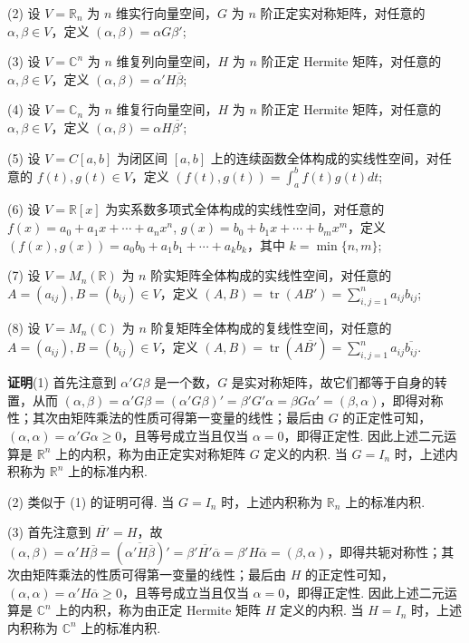 \documentclass[UTF8,12pt,a4paper,fontset=fandol]{ctexart}
\begin{document}
(2) 设 $V=\mathbb{R}_n$ 为 $n$ 维实行向量空间，$G$ 为 $n$ 阶正定实对称矩阵，对任意的 $\alpha,\beta\in V$，定义 $(\alpha,\beta)=\alpha G\beta'$;

(3) 设 $V=\mathbb{C}^n$ 为 $n$ 维复列向量空间，$H$ 为 $n$ 阶正定 Hermite 矩阵，对任意的 $\alpha,\beta\in V$，定义 $(\alpha,\beta)=\alpha'H\overline{\beta}$;

(4) 设 $V=\mathbb{C}_n$ 为 $n$ 维复行向量空间，$H$ 为 $n$ 阶正定 Hermite 矩阵，对任意的 $\alpha,\beta\in V$，定义 $(\alpha,\beta)=\alpha H\overline{\beta'}$;

(5) 设 $V=C[a,b]$ 为闭区间 $[a,b]$ 上的连续函数全体构成的实线性空间，对任意的 $f(t),g(t)\in V$，定义 $(f(t),g(t))=\int_a^b f(t)g(t)dt$;

(6) 设 $V=\mathbb{R}[x]$ 为实系数多项式全体构成的实线性空间，对任意的 $f(x)=a_0+a_1x+\cdots+a_nx^n$, $g(x)=b_0+b_1x+\cdots+b_mx^m$，定义 $(f(x),g(x))=a_0b_0+a_1b_1+\cdots+a_kb_k$，其中 $k=\min\{n,m\}$;

(7) 设 $V=M_n(\mathbb{R})$ 为 $n$ 阶实矩阵全体构成的实线性空间，对任意的 $A=(a_{ij}),B=(b_{ij})\in V$，定义 $(A,B)=\operatorname{tr}(AB')=\sum_{i,j=1}^n a_{ij}b_{ij}$;

(8) 设 $V=M_n(\mathbb{C})$ 为 $n$ 阶复矩阵全体构成的复线性空间，对任意的 $A=(a_{ij}),B=(b_{ij})\in V$，定义 $(A,B)=\operatorname{tr}(A\overline{B'})=\sum_{i,j=1}^n a_{ij}\overline{b_{ij}}$.

\noindent\textbf{证明}\quad (1) 首先注意到 $\alpha'G\beta$ 是一个数，$G$ 是实对称矩阵，故它们都等于自身的转置，从而 $(\alpha,\beta)=\alpha'G\beta=(\alpha'G\beta)'=\beta'G'\alpha=\beta G\alpha'=(\beta,\alpha)$，即得对称性；其次由矩阵乘法的性质可得第一变量的线性；最后由 $G$ 的正定性可知，$(\alpha,\alpha)=\alpha'G\alpha\ge 0$，且等号成立当且仅当 $\alpha=0$，即得正定性. 因此上述二元运算是 $\mathbb{R}^n$ 上的内积，称为由正定实对称矩阵 $G$ 定义的内积. 当 $G=I_n$ 时，上述内积称为 $\mathbb{R}^n$ 上的标准内积.

(2) 类似于 (1) 的证明可得. 当 $G=I_n$ 时，上述内积称为 $\mathbb{R}_n$ 上的标准内积.

(3) 首先注意到 $\overline{H'}=H$，故 $(\alpha,\beta)=\alpha'H\overline{\beta}=(\overline{\alpha'H\overline{\beta}})'=\beta'\overline{H'}\overline{\alpha}=\beta'H\overline{\alpha}=(\beta,\alpha)$，即得共轭对称性；其次由矩阵乘法的性质可得第一变量的线性；最后由 $H$ 的正定性可知，$(\alpha,\alpha)=\alpha'H\overline{\alpha}\ge 0$，且等号成立当且仅当 $\alpha=0$，即得正定性. 因此上述二元运算是 $\mathbb{C}^n$ 上的内积，称为由正定 Hermite 矩阵 $H$ 定义的内积. 当 $H=I_n$ 时，上述内积称为 $\mathbb{C}^n$ 上的标准内积.
\end{document}
